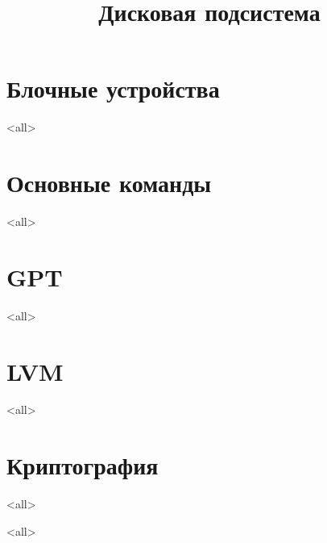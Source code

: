 

\title{Дисковая подсистема}









\section{Блочные устройства}
\mode<all>{}
\section{Основные команды}
\mode<all>{}
\section{GPT}
\mode<all>{}
\section{LVM}
\mode<all>{}
\section{Криптография}
\mode<all>{}

\mode<all>

